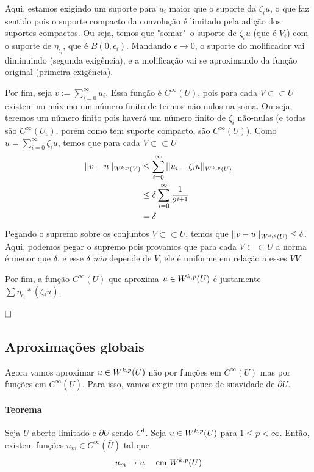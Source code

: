 \documentclass[11pt]{article}
\newcommand{\qed}{$\hfill\square$}
\newcommand{\e}{\epsilon}
\newcommand{\pu}{\partial U}
\begin{document}
Aqui, estamos exigindo um suporte para \( u_i \) maior que o suporte da \( \zeta_iu \), o que faz sentido pois o suporte compacto da convolução é limitado pela adição dos suportes compactos. Ou seja, temos que "somar"\ o suporte de \( \zeta_iu \) (que é \( V_i \)) com o suporte de \( \eta_{\e_i} \), que é \( B(0, \e_i) \). Mandando \( \e\rightarrow 0 \), o suporte do molificador vai diminuindo (segunda exigência), e a molificação vai se aproximando da função original (primeira exigência).

Por fim, seja $ v:=\sum_{i=0}^{\infty} u_i $. Essa função é \( C^\infty(U) \), pois para cada \( V \subset\subset U \) existem no máximo um número finito de termos não-nulos na soma. Ou seja, teremos um número finito pois haverá um número finito de \( \zeta_i \) não-nulas (e todas são \( C^\infty (U_\e) \), porém como tem suporte compacto, são \( C^\infty(U) \)). Como \( u=\sum_{i=0}^{\infty}\zeta_iu  \), temos que para cada \( V \subset\subset U \) 
\begin{align*}
	||v - u||_{W^{k,p}(V)} &\leq \sum_{i=0}^{\infty} ||u_i - \zeta_iu||_{W^{k,p}(U)} \\
	&\leq \delta  \sum_{i=0}^{\infty}  \frac{1}{2^{i+1}}\\
	&= \delta
\end{align*} Pegando o supremo sobre os conjuntos \( V \subset\subset U \), temos que \( ||v-u||_{W^{k,p}(U)} \leq \delta \). Aqui, podemos pegar o supremo pois provamos que para cada \( V \subset\subset U \) a norma é menor que \( \delta \), e esse \( \delta \) \textit{não} depende de \( V \), ele é uniforme em relação a esses \( V V\).

Por fim, a função \( C^{\infty}(U) \) que aproxima \( u \in W^{k,p}(U) \) é justamente \( \sum \eta_{\e_i} * (\zeta_i u) \).

\qed




\subsection{Aproximações globais}

Agora vamos aproximar \( u \in W^{k,p}(U) \) não por funções em \( C^\infty(U) \) mas por funções em \( C^\infty(\overline{U}) \). Para isso, vamos exigir um pouco de suavidade de \( \pu \).

\paragraph{Teorema} Seja \( U \) aberto limitado e \( \pu \) sendo \( C^1 \). Seja \( u \in W^{k,p}(U) \) para \( 1 \leq p < \infty \). Então, existem funções \( u_m \in C^\infty(\overline{U}) \) tal que \[ u_m \rightarrow u \quad \text{ em }W^{k,p}(U) \]
\end{document}
